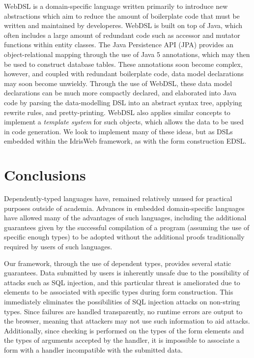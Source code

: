 \documentclass[preprint]{sigplanconf}
\begin{document}
WebDSL \cite{webdsl} is a domain-specific language written primarily to introduce new abstractions which aim to reduce the amount of boilerplate code that must be written and maintained by developeres. WebDSL is built on top of Java, which often includes a large amount of redundant code such as accessor and mutator functions within entity classes. The Java Persistence API (JPA) \cite{jpa} provides an object-relational mapping through the use of Java 5 annotations, which may then be used to construct database tables. These annotations soon become complex, however, and coupled with redundant boilerplate code, data model declarations may soon become unwieldy. Through the use of WebDSL, these data model declarations can be much more compactly declared, and elaborated into Java code by parsing the data-modelling DSL into an abstract syntax tree, applying rewrite rules, and pretty-printing. WebDSL also applies similar concepts to implement a \textit{template system} for such objects, which allows the data to be used in code generation. We look to implement many of these ideas, but as DSLs embedded within the IdrisWeb framework, as with the form construction EDSL.


\section{Conclusions}
Dependently-typed languages have, remained relatively unused for practical purposes outside of academia. Advances in embedded domain-specific languages have allowed many of the advantages of such languages, including the additional guarantees given by the successful compilation of a program (assuming the use of specific enough types) to be adopted without the additional proofs traditionally required by users of such languages.

Our framework, through the use of dependent types, provides several static guarantees. Data submitted by users is inherently unsafe due to the possibility of attacks such as SQL injection, and this particular threat is ameliorated due to elements to be associated with specific types during form construction. This immediately eliminates the possibilities of SQL injection attacks on non-string types. Since failures are handled transparently, no runtime errors are output to the browser, meaning that attackers may not use such information to aid attacks. Additionally, since checking is performed on the types of the form elements and the types of arguments accepted by the handler, it is impossible to associate a form with a handler incompatible with the submitted data.
\end{document}
